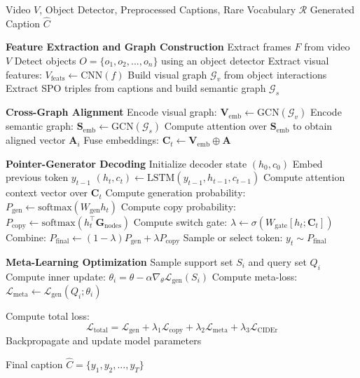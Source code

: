 \documentclass[journal]{IEEEtran}
\begin{document}
\begin{algorithm}[!ht]
\caption{Meta-Aware Pointer-Generator Enhanced VSVCap Pipeline}
\begin{algorithmic}[1]
\Require Video $V$, Object Detector, Preprocessed Captions, Rare Vocabulary $\mathcal{R}$
\Ensure Generated Caption $\hat{C}$

\State \textbf{Feature Extraction and Graph Construction}
\State Extract frames $F$ from video $V$
    \State Detect objects $O = \{o_1, o_2, ..., o_n\}$ using an object detector
    \State Extract visual features: $V_{\text{feats}} \gets \text{CNN}(f)$
\EndFor
\State Build visual graph $\mathcal{G}_v$ from object interactions
\State Extract SPO triples from captions and build semantic graph $\mathcal{G}_s$

\Statex

\State \textbf{Cross-Graph Alignment}
\State Encode visual graph: $\mathbf{V}_{\text{emb}} \gets \text{GCN}(\mathcal{G}_v)$
\State Encode semantic graph: $\mathbf{S}_{\text{emb}} \gets \text{GCN}(\mathcal{G}_s)$
    \State Compute attention over $\mathbf{S}_{\text{emb}}$ to obtain aligned vector $\mathbf{A}_i$
\EndFor
\State Fuse embeddings: $\mathbf{C}_t \gets \mathbf{V}_{\text{emb}} \oplus \mathbf{A}$ 

\Statex

\State \textbf{Pointer-Generator Decoding}
\State Initialize decoder state $(h_0, c_0)$
    \State Embed previous token $y_{t-1}$
    \State $(h_t, c_t) \gets \text{LSTM}(y_{t-1}, h_{t-1}, c_{t-1})$
    \State Compute attention context vector over $\mathbf{C}_t$
    \State Compute generation probability: $P_{\text{gen}} \gets \text{softmax}(W_{\text{gen}} h_t)$
    \State Compute copy probability: $P_{\text{copy}} \gets \text{softmax}(h_t^\top \mathbf{G}_{\text{nodes}})$
    \State Compute switch gate: $\lambda \gets \sigma(W_{\text{gate}}[h_t; \mathbf{C}_t])$
    \State Combine: $P_{\text{final}} \gets (1 - \lambda) P_{\text{gen}} + \lambda P_{\text{copy}}$
    \State Sample or select token: $y_t \sim P_{\text{final}}$
\EndFor

\Statex

\State \textbf{Meta-Learning Optimization}
    \State Sample support set $S_i$ and query set $Q_i$
    \State Compute inner update: $\theta_i = \theta - \alpha \nabla_{\theta} \mathcal{L}_{\text{gen}}(S_i)$
    \State Compute meta-loss: $\mathcal{L}_{\text{meta}} \gets \mathcal{L}_{\text{gen}}(Q_i; \theta_i)$
\EndFor

\State Compute total loss: 
\[
\mathcal{L}_{\text{total}} = \mathcal{L}_{\text{gen}} + \lambda_1 \mathcal{L}_{\text{copy}} + \lambda_2 \mathcal{L}_{\text{meta}} + \lambda_3 \mathcal{L}_{\text{CIDEr}}
\]
\State Backpropagate and update model parameters


\State \Return Final caption $\hat{C} = \{y_1, y_2, ..., y_T\}$
\end{algorithmic}
\end{algorithm}



\end{document}
